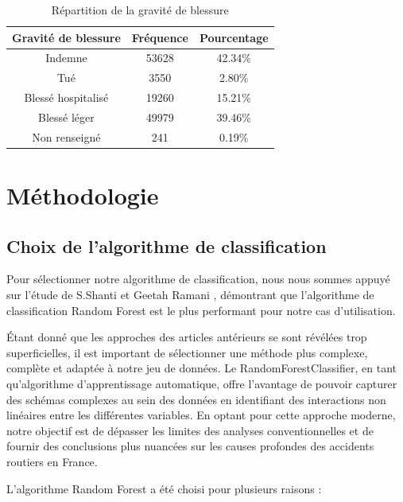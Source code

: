 \documentclass[french]{article}
\begin{document}
\begin{table}[h]
\centering
\begin{tabular}{|c|c|c|}
\hline
\textbf{Gravité de blessure} & \textbf{Fréquence} & \textbf{Pourcentage} \\
\hline
Indemne & 53628 & 42.34\% \\
Tué & 3550 & 2.80\% \\
Blessé hospitalisé & 19260 & 15.21\% \\
Blessé léger & 49979 & 39.46\% \\
Non renseigné & 241 & 0.19\% \\
\hline
\end{tabular}
\caption{Répartition de la gravité de blessure}
\end{table}

\section{Méthodologie}
\subsection{Choix de l’algorithme de classification} 
Pour sélectionner notre algorithme de classification, nous nous sommes appuyé sur l’étude de S.Shanti et Geetah Ramani \cite{classification-colision}, démontrant que l’algorithme de classification Random Forest est le plus performant pour notre cas d’utilisation.

Étant donné que les approches des articles antérieurs se sont révélées trop superficielles, il est important de sélectionner une méthode plus complexe, complète et adaptée à notre jeu de données. Le RandomForestClassifier, en tant qu’algorithme d’apprentissage automatique, offre l’avantage de pouvoir capturer des schémas complexes au sein des données en identifiant des interactions non linéaires entre les différentes variables. En optant pour cette approche moderne, notre objectif est de dépasser les limites des analyses conventionnelles et de fournir des conclusions plus nuancées sur les causes profondes des accidents routiers en France.

L’algorithme Random Forest a été choisi pour plusieurs raisons :
\end{document}
